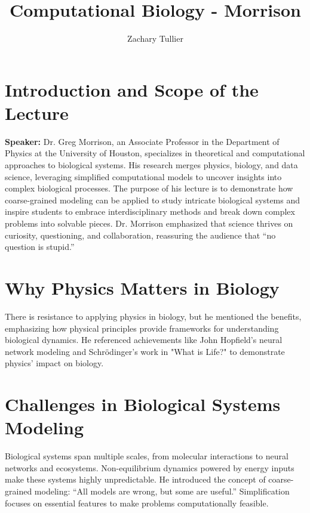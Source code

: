 \documentclass[12pt]{article}
\begin{document}
\singlespacing  %
\title{Computational Biology - Morrison}

\author[1]{Zachary Tullier}
\date{}
\maketitle


\section{Introduction and Scope of the Lecture}
    \textbf{Speaker:} Dr. Greg Morrison, an Associate Professor in the Department of Physics at the University of Houston, specializes in theoretical and computational approaches to biological systems. His research merges physics, biology, and data science, leveraging simplified computational models to uncover insights into complex biological processes. The purpose of his lecture is to demonstrate how coarse-grained modeling can be applied to study intricate biological systems and inspire students to embrace interdisciplinary methods and break down complex problems into solvable pieces. Dr. Morrison emphasized that science thrives on curiosity, questioning, and collaboration, reassuring the audience that “no question is stupid.”


\section{Why Physics Matters in Biology}
    There is resistance to applying physics in biology, but he mentioned the benefits, emphasizing how physical principles provide frameworks for understanding biological dynamics. He referenced achievements like John Hopfield’s neural network modeling and Schrödinger’s work in "What is Life?" to demonstrate physics' impact on biology.


\section{Challenges in Biological Systems Modeling}
    Biological systems span multiple scales, from molecular interactions to neural networks and ecosystems. Non-equilibrium dynamics powered by energy inputs make these systems highly unpredictable. He introduced the concept of coarse-grained modeling: “All models are wrong, but some are useful.” Simplification focuses on essential features to make problems computationally feasible.
\end{document}
